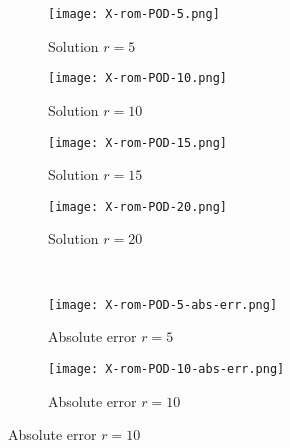 \begin{figure}[!htb]
     \begin{center}
        \begin{subfigure}[b]{0.23\textwidth}
            \begin{center}
                \texttt{[image: X-rom-POD-5.png]}
            \end{center}
            \caption{Solution $r = 5$}
        \end{subfigure}
   \begin{subfigure}[b]{0.23\textwidth}
            \begin{center}
       \texttt{[image: X-rom-POD-10.png]}
            \end{center}
            \caption{Solution $r = 10$}
        \end{subfigure}
   \begin{subfigure}[b]{0.23\textwidth}
            \begin{center}
       \texttt{[image: X-rom-POD-15.png]}
            \end{center}
            \caption{Solution $r = 15$}
        \end{subfigure}
   \begin{subfigure}[b]{0.23\textwidth}
       \begin{center}
        \texttt{[image: X-rom-POD-20.png]}
       \end{center}
       \caption{Solution $r = 20$}
        \end{subfigure}\\  
        \begin{subfigure}[b]{0.23\textwidth}
            \begin{center}
                \texttt{[image: X-rom-POD-5-abs-err.png]}
            \end{center}
            \caption{Absolute error $r = 5$}
        \end{subfigure}  
        \begin{subfigure}[b]{0.23\textwidth}
            \begin{center}
                \texttt{[image: X-rom-POD-10-abs-err.png]}
            \end{center}
            \caption{Absolute error $r = 10$}
        \end{subfigure}   

\end{center}
\end{figure}
